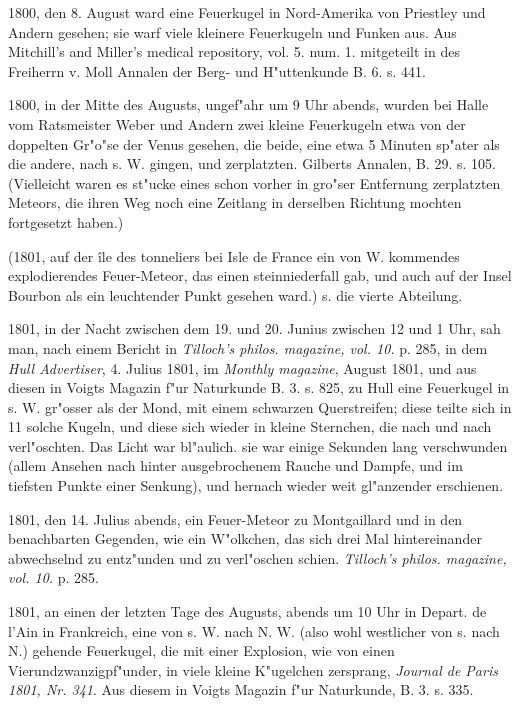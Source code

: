 \documentclass[a4paper, 11pt, oneside, polutonikogreek, german]{article}
\begin{document}
1800, den 8. August ward eine Feuerkugel in Nord-Amerika von Priestley und Andern gesehen; sie warf viele kleinere Feuerkugeln und Funken aus. Aus Mitchill's and Miller's medical repository, vol. 5. num. 1. mitgeteilt in des Freiherrn v. Moll Annalen der Berg- und H"uttenkunde B. 6. s. 441.

1800, in der Mitte des Augusts, ungef"ahr um 9 Uhr abends, wurden bei Halle vom Ratsmeister Weber und Andern zwei kleine Feuerkugeln etwa von der doppelten Gr"o"se der Venus gesehen, die beide, eine etwa 5 Minuten sp"ater als die andere, nach s. W. gingen, und zerplatzten. Gilberts Annalen, B. 29. s. 105. (Vielleicht waren es st"ucke eines schon vorher in gro"ser Entfernung zerplatzten Meteors, die ihren Weg noch eine Zeitlang in derselben Richtung mochten fortgesetzt haben.)

(1801, auf der île des tonneliers bei Isle de France ein von W. kommendes explodierendes Feuer-Meteor, das einen steinniederfall gab, und auch auf der Insel Bourbon als ein leuchtender Punkt gesehen ward.) s. die vierte Abteilung.

1801, in der Nacht zwischen dem 19. und 20. Junius zwischen 12 und 1 Uhr, sah man, nach einem Bericht in \emph{Tilloch's philos. magazine, vol. 10.} p. 285, in dem \emph{Hull Advertiser}, 4. Julius 1801, im \emph{Monthly magazine}, August 1801, und aus diesen in Voigts Magazin f"ur Naturkunde B. 3. s. 825, zu Hull eine Feuerkugel in s. W. gr"osser als der Mond, mit einem schwarzen Querstreifen; diese teilte sich in 11 solche Kugeln, und diese sich wieder in kleine Sternchen, die nach und nach verl"oschten. Das Licht war bl"aulich. sie war einige Sekunden lang verschwunden (allem Ansehen nach hinter ausgebrochenem Rauche und Dampfe, und im tiefsten Punkte einer Senkung), und hernach wieder weit gl"anzender erschienen.

1801, den 14. Julius abends, ein Feuer-Meteor zu Montgaillard und in den benachbarten Gegenden, wie ein W"olkchen, das sich drei Mal hintereinander abwechselnd zu entz"unden und zu verl"oschen schien. \emph{Tilloch's philos. magazine, vol. 10.} p. 285.

1801, an einen der letzten Tage des Augusts, abends um 10 Uhr in Depart. de l'Ain in Frankreich, eine von s. W. nach N. W. (also wohl westlicher von s. nach N.) gehende Feuerkugel, die mit einer Explosion, wie von einen Vierundzwanzigpf"under, in viele kleine K"ugelchen zersprang, \emph{Journal de Paris 1801, Nr. 341}. Aus diesem in Voigts Magazin f"ur Naturkunde, B. 3. s. 335.
\end{document}
